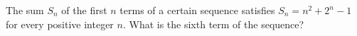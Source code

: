 The sum $S_n$ of the first $n$ terms of a certain sequence satisfies $S_n=n^2+2^n-1$ for every positive integer $n$. What is the sixth term of the sequence?
